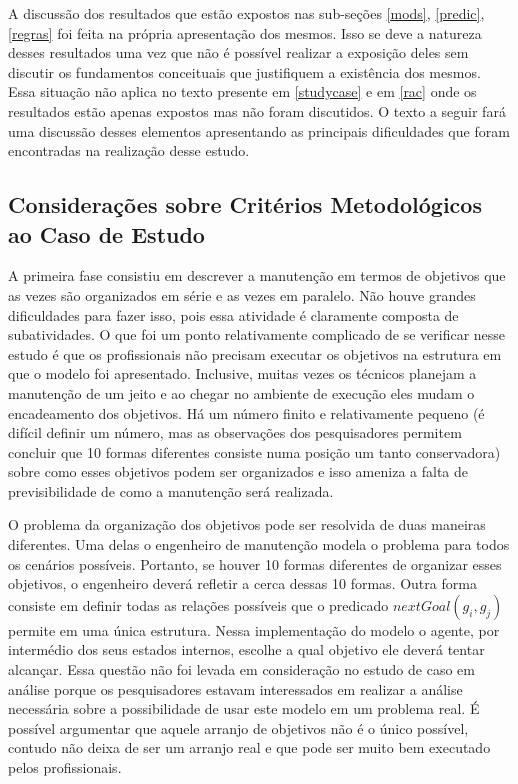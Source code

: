 A discussão dos resultados que estão expostos nas sub-seções \ref{mods}, \ref{predic}, \ref{regras} foi feita na própria apresentação dos mesmos. Isso se deve a natureza desses resultados uma vez que não é possível realizar a exposição deles sem discutir os fundamentos conceituais que justifiquem a existência dos mesmos. Essa situação não aplica no texto presente em \ref{studycase} e em \ref{rac} onde os resultados estão apenas expostos mas não foram discutidos. O texto a seguir fará uma discussão desses elementos apresentando as principais dificuldades que foram encontradas na realização desse estudo. 

\subsection{Considerações sobre Critérios Metodológicos ao Caso de Estudo} \label{conscritmetcasoestudo}

A primeira fase consistiu em descrever a manutenção em termos de objetivos que as vezes são organizados em série e as vezes em paralelo. Não houve grandes dificuldades para fazer isso, pois essa atividade é claramente composta de subatividades. O que foi um ponto relativamente complicado de se verificar nesse estudo é que os profissionais não precisam executar os objetivos na estrutura em que o modelo foi apresentado. Inclusive, muitas vezes os técnicos planejam a manutenção de um jeito e ao chegar no ambiente de execução eles mudam o encadeamento dos objetivos. Há um número finito e relativamente pequeno (é difícil definir um número, mas as observações dos pesquisadores permitem concluir que 10 formas diferentes consiste numa posição um tanto conservadora) sobre como esses objetivos podem ser organizados e isso ameniza a falta de previsibilidade de como a manutenção será realizada. 

O problema da organização dos objetivos pode ser resolvida de duas maneiras diferentes. Uma delas o engenheiro de manutenção modela o problema para todos os cenários possíveis. Portanto, se houver 10 formas diferentes de organizar esses objetivos, o engenheiro deverá refletir a cerca dessas 10 formas. Outra forma consiste em definir todas as relações possíveis que o predicado $nextGoal(g_i,g_j)$ permite em uma única estrutura. Nessa implementação do modelo o agente, por intermédio dos seus estados internos, escolhe a qual objetivo ele deverá tentar alcançar. Essa questão não foi levada em consideração no estudo de caso em análise porque os pesquisadores estavam interessados em realizar a análise necessária sobre a possibilidade de usar este modelo em um problema real. É possível argumentar que aquele arranjo de objetivos não é o único possível, contudo não deixa de ser um arranjo real e que pode ser muito bem executado pelos profissionais. 

